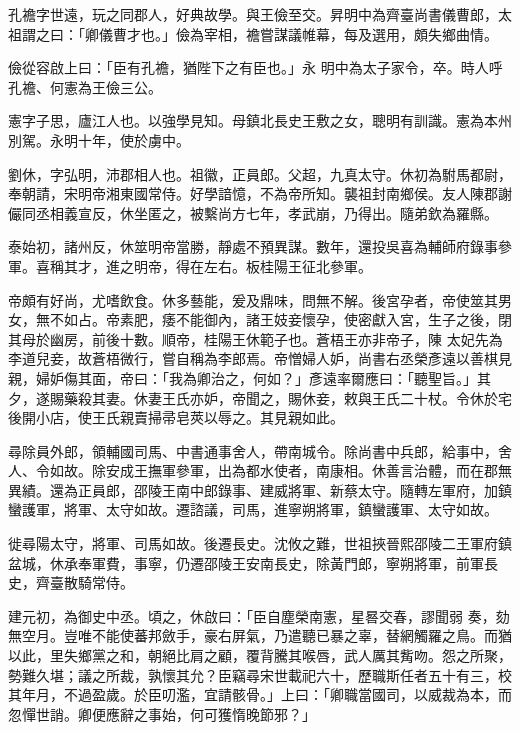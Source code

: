 \begin{pinyinscope}
 孔襜字世遠，玩之同郡人，好典故學。與王儉至交。昇明中為齊臺尚書儀曹郎，太祖謂之曰：「卿儀曹才也。」儉為宰相，襜嘗謀議帷幕，每及選用，頗失鄉曲情。



 儉從容啟上曰：「臣有孔襜，猶陛下之有臣也。」永
 明中為太子家令，卒。時人呼孔襜、何憲為王儉三公。



 憲字子思，廬江人也。以強學見知。母鎮北長史王敷之女，聰明有訓識。憲為本州別駕。永明十年，使於虜中。



 劉休，字弘明，沛郡相人也。祖徽，正員郎。父超，九真太守。休初為駙馬都尉，奉朝請，宋明帝湘東國常侍。好學諳憶，不為帝所知。襲祖封南鄉侯。友人陳郡謝儼同丞相義宣反，休坐匿之，被繫尚方七年，孝武崩，乃得出。隨弟欽為羅縣。



 泰始初，諸州反，休筮明帝當勝，靜處不預異謀。數年，還投吳喜為輔師府錄事參軍。喜稱其才，進之明帝，得在左右。板桂陽王征北參軍。



 帝頗有好尚，尤嗜飲食。休多藝能，爰及鼎味，問無不解。後宮孕者，帝使筮其男女，無不如占。帝素肥，痿不能御內，諸王妓妾懷孕，使密獻入宮，生子之後，閉其母於幽房，前後十數。順帝，桂陽王休範子也。蒼梧王亦非帝子，陳
 太妃先為李道兒妾，故蒼梧微行，嘗自稱為李郎焉。帝憎婦人妒，尚書右丞榮彥遠以善棋見親，婦妒傷其面，帝曰：「我為卿治之，何如？」彥遠率爾應曰：「聽聖旨。」其夕，遂賜藥殺其妻。休妻王氏亦妒，帝聞之，賜休妾，敕與王氏二十杖。令休於宅後開小店，使王氏親賣掃帚皂莢以辱之。其見親如此。



 尋除員外郎，領輔國司馬、中書通事舍人，帶南城令。除尚書中兵郎，給事中，舍人、令如故。除安成王撫軍參軍，出為都水使者，南康相。休善言治體，而在郡無異績。還為正員郎，邵陵王南中郎錄事、建威將軍、新蔡太守。隨轉左軍府，加鎮蠻護軍，將軍、太守如故。遷諮議，司馬，進寧朔將軍，鎮蠻護軍、太守如故。



 徙尋陽太守，將軍、司馬如故。後遷長史。沈攸之難，世祖挾晉熙邵陵二王軍府鎮盆城，休承奉軍費，事寧，仍遷邵陵王安南長史，除黃門郎，寧朔將軍，前軍長史，齊臺散騎常侍。



 建元初，為御史中丞。頃之，休啟曰：「臣自塵榮南憲，星晷交春，謬聞弱
 奏，劾無空月。豈唯不能使蕃邦斂手，豪右屏氣，乃遣聽已暴之辜，替網觸羅之鳥。而猶以此，里失鄉黨之和，朝絕比肩之顧，覆背騰其喉唇，武人厲其觜吻。怨之所聚，勢難久堪；議之所裁，孰懷其允？臣竊尋宋世載祀六十，歷職斯任者五十有三，校其年月，不過盈歲。於臣叨濫，宜請骸骨。」上曰：「卿職當國司，以威裁為本，而忽憚世誚。卿便應辭之事始，何可獲惰晚節邪？」




\end{pinyinscope}
